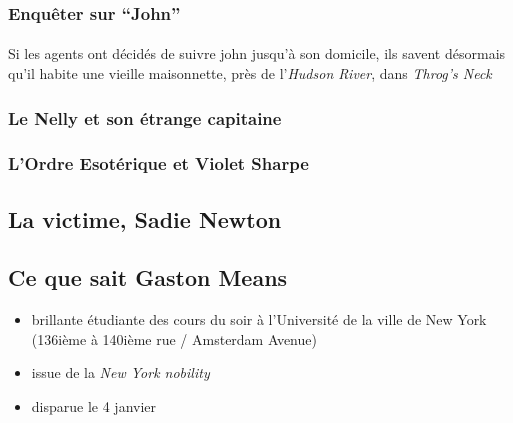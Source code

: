 
\paragraph{} 

\subsubsection{Enquêter sur ``John''}

\paragraph{} Si les agents ont décidés de suivre \gls{john} jusqu'à son domicile, ils savent désormais qu'il habite une vieille maisonnette, près
de l'\emph{Hudson River}, dans \emph{Throg's Neck}

\subsubsection{Le Nelly et son étrange capitaine}

\subsubsection{L'Ordre Esotérique et Violet Sharpe}


\subsection{La victime, Sadie Newton}

\subsection{Ce que sait Gaston Means}

\begin{itemize}
 \item brillante étudiante des cours du soir à l'Université de la ville de New York (136ième à 140ième rue / Amsterdam Avenue)
 \item issue de la \emph{New York nobility}
 \item disparue le 4 janvier 
\end{itemize}
